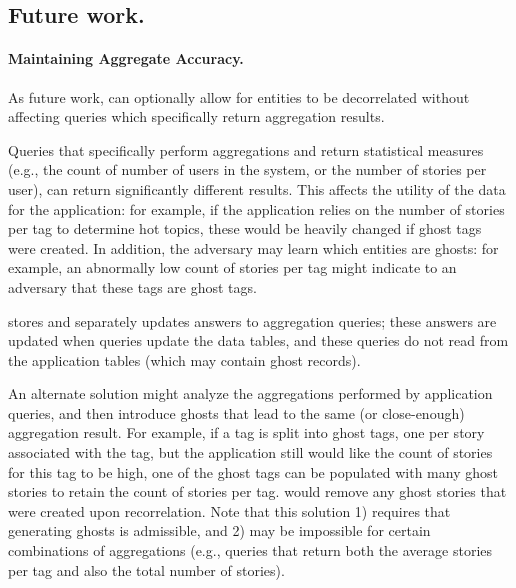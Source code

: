 \subsection{Future work.}
\paragraph{Maintaining Aggregate Accuracy.}
As future work, \sys can optionally allow for entities to be decorrelated without affecting queries which
specifically return aggregation results.

Queries that specifically perform aggregations and return statistical measures (e.g.,
the count of number of users in the system, or the number of stories per user), can return
significantly different results. This affects the utility of the data for the application: for
example, if the application relies on the number of stories per tag to determine hot topics, these
would be heavily changed if ghost tags were created.  In addition, the adversary may learn which
entities are ghosts: for example, an abnormally low count of stories per tag might indicate to an
adversary that these tags are ghost tags.  

\sys stores and separately updates answers to aggregation queries;
these answers are updated when queries update the data tables, and these queries do not read from
the application tables (which may contain ghost records).

An alternate solution might analyze the aggregations performed by application queries, and then
introduce ghosts that lead to the same (or close-enough) aggregation result. For example, if a tag
is split into ghost tags, one per story associated with the tag, but the application still would
like the count of stories for this tag to be high, one of the ghost tags can be populated with many
ghost stories to retain the count of stories per tag.  \sys would remove any ghost stories that
were created upon recorrelation. Note that this solution 1) requires that generating ghosts is
admissible, and 2) may be impossible for certain combinations of aggregations (e.g., queries that
return both the average stories per tag and also the total number of stories).


\fi
